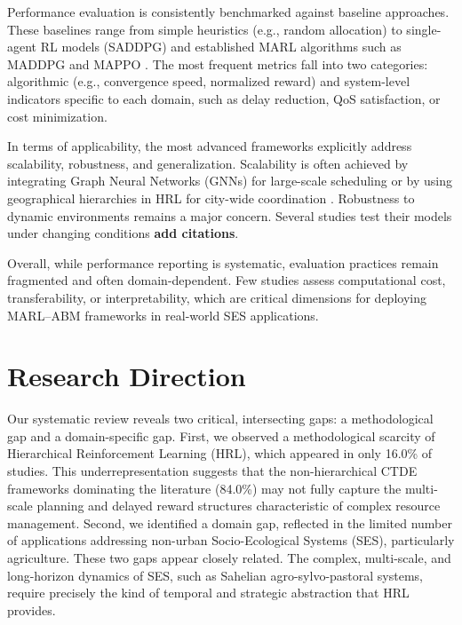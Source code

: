 \documentclass[conference]{IEEEtran}
\begin{document}
Performance evaluation is consistently benchmarked against baseline approaches. These baselines range from simple heuristics (e.g., random allocation) to single-agent RL models (SADDPG) \cite{rayyan-353821831} and established MARL algorithms such as MADDPG and MAPPO \cite{rayyan-353820459, rayyan-353822239}. The most frequent metrics fall into two categories: algorithmic (e.g., convergence speed, normalized reward) and system-level indicators specific to each domain, such as delay reduction, QoS satisfaction, or cost minimization.

In terms of applicability, the most advanced frameworks explicitly address scalability, robustness, and generalization. Scalability is often achieved by integrating Graph Neural Networks (GNNs) for large-scale scheduling \cite{rayyan-353821868} or by using geographical hierarchies in HRL for city-wide coordination \cite{rayyan-353821405}. Robustness to dynamic environments remains a major concern. Several studies test their models under changing conditions \cite{rayyan-353821111} \textbf{add citations}.

Overall, while performance reporting is systematic, evaluation practices remain fragmented and often domain-dependent. Few studies assess computational cost, transferability, or interpretability, which are critical dimensions for deploying MARL–ABM frameworks in real-world SES applications.

\section{Research Direction}
\label{research_directions}

Our systematic review reveals two critical, intersecting gaps: a methodological gap and a domain-specific gap. First, we observed a methodological scarcity of Hierarchical Reinforcement Learning (HRL), which appeared in only 16.0\% of studies. This underrepresentation suggests that the non-hierarchical CTDE frameworks dominating the literature (84.0\%) may not fully capture the multi-scale planning and delayed reward structures characteristic of complex resource management. Second, we identified a domain gap, reflected in the limited number of applications addressing non-urban Socio-Ecological Systems (SES), particularly agriculture. These two gaps appear closely related. The complex, multi-scale, and long-horizon dynamics of SES, such as Sahelian agro-sylvo-pastoral systems, require precisely the kind of temporal and strategic abstraction that HRL provides.
\end{document}

